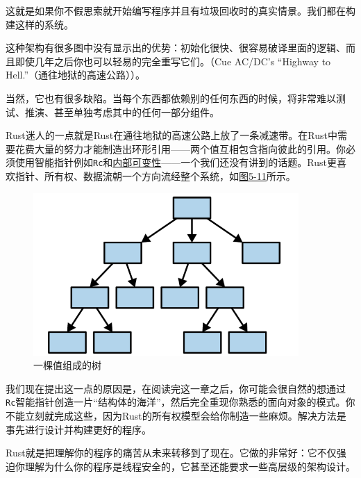 这就是如果你不假思索就开始编写程序并且有垃圾回收时的真实情景。我们都在构建这样的系统。

这种架构有很多图中没有显示出的优势：初始化很快、很容易破译里面的逻辑、而且即使几年之后你也可以轻易的完全重写它们。（Cue AC/DC's “Highway to Hell.”（通往地狱的高速公路））。

当然，它也有很多缺陷。当每个东西都依赖别的任何东西的时候，将非常难以测试、推演、甚至单独考虑其中的任何一部分组件。

Rust迷人的一点就是Rust在通往地狱的高速公路上放了一条减速带。在Rust中需要花费大量的努力才能制造出环形引用——两个值互相包含指向彼此的引用。你必须使用智能指针例如\texttt{Rc}和\hyperref[intermut]{内部可变性}——一个我们还没有讲到的话题。Rust更喜欢指针、所有权、数据流朝一个方向流经整个系统，如\hyperref[f5-11]{图5-11}所示。

\begin{figure}[htbp]
    \centering
    \includegraphics[width=0.9\textwidth]{../img/f5-11.png}
    \caption{一棵值组成的树}
    \label{f5-11}
\end{figure}

我们现在提出这一点的原因是，在阅读完这一章之后，你可能会很自然的想通过\texttt{Rc}智能指针创造一片“结构体的海洋”，然后完全重现你熟悉的面向对象的模式。你不能立刻就完成这些，因为Rust的所有权模型会给你制造一些麻烦。解决方法是事先进行设计并构建更好的程序。

Rust就是把理解你的程序的痛苦从未来转移到了现在。它做的非常好：它不仅强迫你理解为什么你的程序是线程安全的，它甚至还能要求一些高层级的架构设计。
